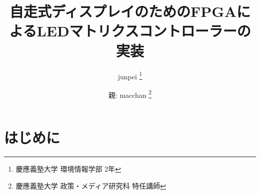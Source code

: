 \documentclass[a4paper,11pt, twocolumn]{ltjsarticle}
\title{ 自走式ディスプレイのためのFPGAによるLEDマトリクスコントローラーの実装 }
\author{ 
  junpei \thanks{慶應義塾大学 環境情報学部 2年}
  \and
  親: macchan \thanks{慶應義塾大学 政策・メディア研究科 特任講師}
}
\date{}
\begin{document}
\maketitle


\section*{はじめに}
\end{document}
